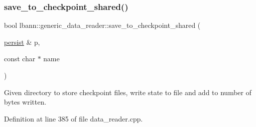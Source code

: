 \subsubsection{\texorpdfstring{save\+\_\+to\+\_\+checkpoint\+\_\+shared()}{save\_to\_checkpoint\_shared()}}
{\footnotesize\ttfamily bool lbann\+::generic\+\_\+data\+\_\+reader\+::save\+\_\+to\+\_\+checkpoint\+\_\+shared (\begin{DoxyParamCaption}\item[{\hyperlink{classlbann_1_1persist}{persist} \&}]{p,  }\item[{const char $\ast$}]{name }\end{DoxyParamCaption})}



Given directory to store checkpoint files, write state to file and add to number of bytes written. 



Definition at line 385 of file data\+\_\+reader.\+cpp.


